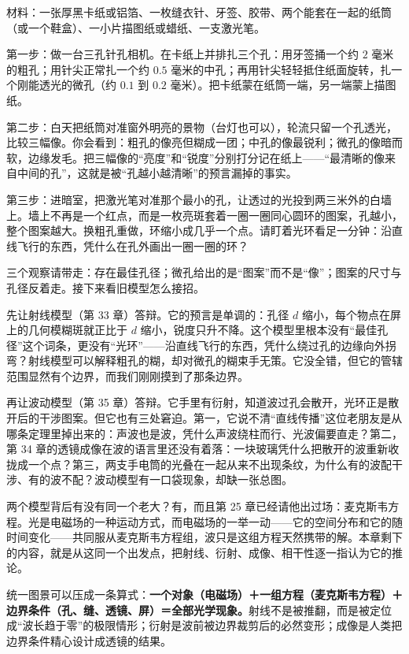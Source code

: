 \begin{experiment}[三个孔与墙上的一圈光环]
材料：一张厚黑卡纸或铝箔、一枚缝衣针、牙签、胶带、两个能套在一起的纸筒（或一个鞋盒）、一小片描图纸或蜡纸、一支激光笔。

第一步：做一台三孔针孔相机。在卡纸上并排扎三个孔：用牙签捅一个约 \(2\) 毫米的粗孔；用针尖正常扎一个约 \(0.5\) 毫米的中孔；再用针尖轻轻抵住纸面旋转，扎一个刚能透光的微孔（约 \(0.1\) 到 \(0.2\) 毫米）。把卡纸蒙在纸筒一端，另一端蒙上描图纸。

第二步：白天把纸筒对准窗外明亮的景物（台灯也可以），轮流只留一个孔透光，比较三幅像。你会看到：粗孔的像亮但糊成一团；中孔的像最锐利；微孔的像暗而软，边缘发毛。把三幅像的“亮度”和“锐度”分别打分记在纸上——“最清晰的像来自中间的孔”，这就是被“孔越小越清晰”的预言漏掉的事实。

第三步：进暗室，把激光笔对准那个最小的孔，让透过的光投到两三米外的白墙上。墙上不再是一个红点，而是一枚亮斑套着一圈一圈同心圆环的图案，孔越小，整个图案越大。换粗孔重做，环缩小成几乎一个点。请盯着光环看足一分钟：沿直线飞行的东西，凭什么在孔外画出一圈一圈的环？
\end{experiment}

三个观察请带走：存在最佳孔径；微孔给出的是“图案”而不是“像”；图案的尺寸与孔径反着走。接下来看旧模型怎么接招。


先让射线模型（第 33 章）答辩。它的预言是单调的：孔径 \(d\) 缩小，每个物点在屏上的几何模糊斑就正比于 \(d\) 缩小，锐度只升不降。这个模型里根本没有“最佳孔径”这个词条，更没有“光环”——沿直线飞行的东西，凭什么绕过孔的边缘向外拐弯？射线模型可以解释粗孔的糊，却对微孔的糊束手无策。它没全错，但它的管辖范围显然有个边界，而我们刚刚摸到了那条边界。

再让波动模型（第 35 章）答辩。它手里有衍射，知道波过孔会散开，光环正是散开后的干涉图案。但它也有三处窘迫。第一，它说不清“直线传播”这位老朋友是从哪条定理里掉出来的：声波也是波，凭什么声波绕柱而行、光波偏要直走？第二，第 34 章的透镜成像在波的语言里还没有着落：一块玻璃凭什么把散开的波重新收拢成一个点？第三，两支手电筒的光叠在一起从来不出现条纹，为什么有的波配干涉、有的波不配？波动模型有一口袋现象，却缺一张总图。

两个模型背后有没有同一个老大？有，而且第 25 章已经请他出过场：麦克斯韦方程。光是电磁场的一种运动方式，而电磁场的一举一动——它的空间分布和它的随时间变化——共同服从麦克斯韦方程组，波只是这组方程天然携带的解。本章剩下的内容，就是从这同一个出发点，把射线、衍射、成像、相干性逐一指认为它的推论。

\begin{mainline}
统一图景可以压成一条算式：\textbf{一个对象（电磁场）＋一组方程（麦克斯韦方程）＋边界条件（孔、缝、透镜、屏）＝全部光学现象。}射线不是被推翻，而是被定位成“波长趋于零”的极限情形；衍射是波前被边界裁剪后的必然变形；成像是人类把边界条件精心设计成透镜的结果。
\end{mainline}

